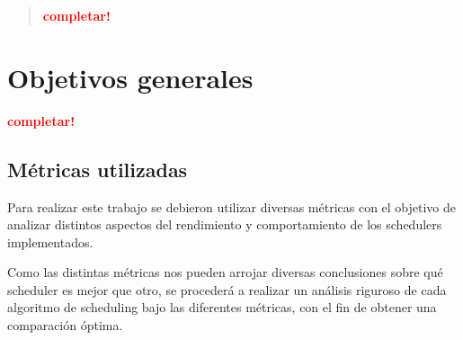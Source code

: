 \documentclass[a4paper]{article}
\begin{document}

\thispagestyle{empty}

\maketitle
\newpage

\thispagestyle{empty}
\vfill
\begin{abstract}
    \vspace{0.5cm}
    \textcolor{red}{\textbf{completar!}}
\end{abstract}

\thispagestyle{empty}
\vspace{1.5cm}
\tableofcontents
\newpage


\newpage
\tableofcontents

\section{Objetivos generales}
\textcolor{red}{\textbf{completar!}}

\subsection{Métricas utilizadas}
Para realizar este trabajo se debieron utilizar diversas métricas con el
objetivo de analizar distintos aspectos del rendimiento y comportamiento de
los schedulers implementados.

Como las distintas métricas nos pueden arrojar diversas conclusiones sobre
qué scheduler es mejor que otro, se procederá a realizar un análisis
riguroso de cada algoritmo de scheduling bajo las diferentes métricas, con
el fin de obtener una comparación óptima.
\end{document}
